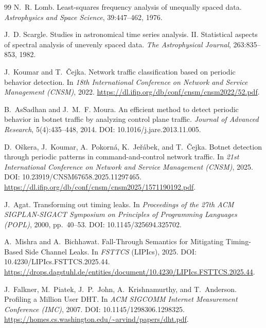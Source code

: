 \documentclass[11pt]{article}
\theoremstyle{definition}
\theoremstyle{remark}
\begin{document}
\begin{thebibliography}{99}
N.~R. Lomb.
\newblock Least-squares frequency analysis of unequally spaced data.
\newblock \emph{Astrophysics and Space Science}, 39:447--462, 1976.

J.~D. Scargle.
\newblock Studies in astronomical time series analysis. II. Statistical aspects of spectral analysis of unevenly spaced data.
\newblock \emph{The Astrophysical Journal}, 263:835--853, 1982.

J.~Koumar and T.~\v{C}ejka.
\newblock Network traffic classification based on periodic behavior detection.
\newblock In \emph{18th International Conference on Network and Service Management (CNSM)}, 2022.
\newblock \url{https://dl.ifip.org/db/conf/cnsm/cnsm2022/52.pdf}.

B.~AsSadhan and J.~M.~F. Moura.
\newblock An efficient method to detect periodic behavior in botnet traffic by analyzing control plane traffic.
\newblock \emph{Journal of Advanced Research}, 5(4):435--448, 2014.
\newblock DOI: 10.1016/j.jare.2013.11.005.

D.~O\v{s}kera, J.~Koumar, A.~Pokorn\'a, K.~Je\v{r}\'abek, and T.~\v{C}ejka.
\newblock Botnet detection through periodic patterns in command-and-control network traffic.
\newblock In \emph{21st International Conference on Network and Service Management (CNSM)}, 2025.
\newblock DOI: 10.23919/CNSM67658.2025.11297465.
\newblock \url{https://dl.ifip.org/db/conf/cnsm/cnsm2025/1571190192.pdf}.


J.~Agat.
\newblock Transforming out timing leaks.
\newblock In \emph{Proceedings of the 27th ACM SIGPLAN-SIGACT Symposium on Principles of Programming Languages (POPL)}, 2000, pp.~40--53.
\newblock DOI: 10.1145/325694.325702.

A.~Mishra and A.~Bichhawat.
\newblock Fall-Through Semantics for Mitigating Timing-Based Side Channel Leaks.
\newblock In \emph{FSTTCS} (LIPIcs), 2025.
\newblock DOI: 10.4230/LIPIcs.FSTTCS.2025.44.
\newblock \url{https://drops.dagstuhl.de/entities/document/10.4230/LIPIcs.FSTTCS.2025.44}.


J.~Falkner, M.~Piatek, J.~P.~John, A.~Krishnamurthy, and T.~Anderson.
\newblock Profiling a Million User DHT.
\newblock In \emph{ACM SIGCOMM Internet Measurement Conference (IMC)}, 2007.
\newblock DOI: 10.1145/1298306.1298325.
\newblock \url{https://homes.cs.washington.edu/~arvind/papers/dht.pdf}.


\end{thebibliography}
\end{document}
